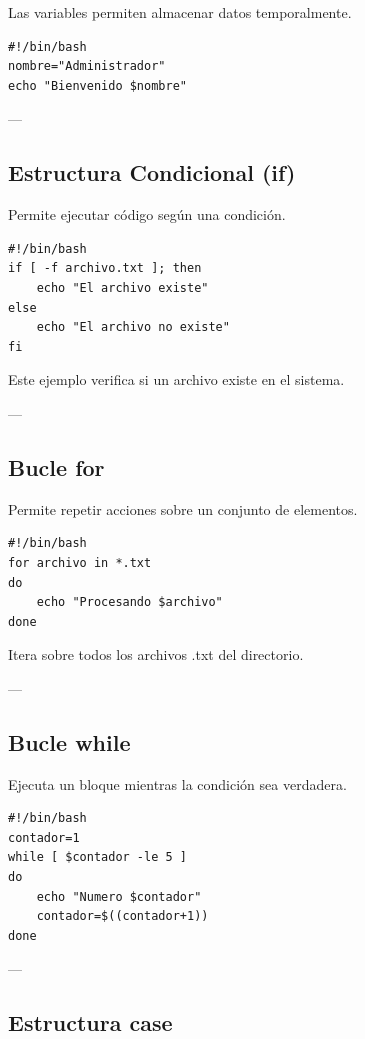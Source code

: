 \documentclass[12pt,a4paper]{article}
\begin{document}
Las variables permiten almacenar datos temporalmente.

\begin{lstlisting}
#!/bin/bash
nombre="Administrador"
echo "Bienvenido $nombre"
\end{lstlisting}

---

\subsection{Estructura Condicional (if)}

Permite ejecutar código según una condición.

\begin{lstlisting}
#!/bin/bash
if [ -f archivo.txt ]; then
    echo "El archivo existe"
else
    echo "El archivo no existe"
fi
\end{lstlisting}

Este ejemplo verifica si un archivo existe en el sistema.

---

\subsection{Bucle for}

Permite repetir acciones sobre un conjunto de elementos.

\begin{lstlisting}
#!/bin/bash
for archivo in *.txt
do
    echo "Procesando $archivo"
done
\end{lstlisting}

Itera sobre todos los archivos .txt del directorio.

---

\subsection{Bucle while}

Ejecuta un bloque mientras la condición sea verdadera.

\begin{lstlisting}
#!/bin/bash
contador=1
while [ $contador -le 5 ]
do
    echo "Numero $contador"
    contador=$((contador+1))
done
\end{lstlisting}

---

\subsection{Estructura case}
\end{document}

